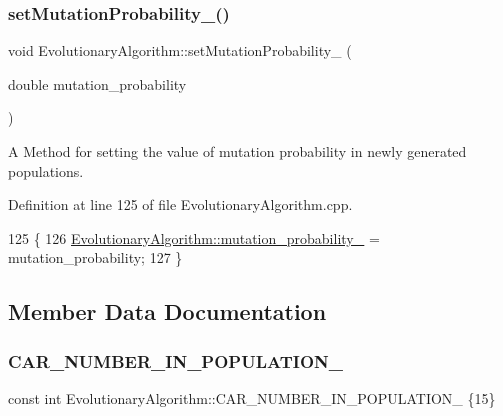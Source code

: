 \subsubsection{\texorpdfstring{set\+Mutation\+Probability\+\_\+()}{setMutationProbability\_()}}
{\footnotesize\ttfamily void Evolutionary\+Algorithm\+::set\+Mutation\+Probability\+\_\+ (\begin{DoxyParamCaption}\item[{double}]{mutation\+\_\+probability }\end{DoxyParamCaption})}



A Method for setting the value of mutation probability in newly generated populations. 



Definition at line 125 of file Evolutionary\+Algorithm.\+cpp.


\begin{DoxyCode}
125                                                                                \{
126     \hyperlink{classEvolutionaryAlgorithm_ab847e49664c7b97e1e55963e6f33b332}{EvolutionaryAlgorithm::mutation\_probability\_} = 
      mutation\_probability;
127 \}
\end{DoxyCode}


\subsection{Member Data Documentation}
\mbox{\label{classEvolutionaryAlgorithm_af466ca42d5d03e212df4575f263f3a8c}} 
\subsubsection{\texorpdfstring{C\+A\+R\+\_\+\+N\+U\+M\+B\+E\+R\+\_\+\+I\+N\+\_\+\+P\+O\+P\+U\+L\+A\+T\+I\+O\+N\+\_\+}{CAR\_NUMBER\_IN\_POPULATION\_}}
{\footnotesize\ttfamily const int Evolutionary\+Algorithm\+::\+C\+A\+R\+\_\+\+N\+U\+M\+B\+E\+R\+\_\+\+I\+N\+\_\+\+P\+O\+P\+U\+L\+A\+T\+I\+O\+N\+\_\+ \{15\}\hspace{0.3cm}{\ttfamily [private]}}



